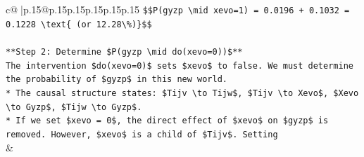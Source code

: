 \documentclass{article}
\begin{document}
{\begin{supertabular}{c@{$\;$}|p{.15\linewidth}@{}p{.15\linewidth}p{.15\linewidth}p{.15\linewidth}p{.15\linewidth}p{.15\linewidth}}
{{{\texttt{\$\$P(gyzp \textbackslash{}mid xevo=1) = 0.0196 + 0.1032 = 0.1228 \textbackslash{}text\{ (or 12.28\textbackslash{}\%)\}\$\$} \\
\\ 
\texttt{**Step 2: Determine \$P(gyzp \textbackslash{}mid do(xevo=0))\$**} \\
\texttt{The intervention \$do(xevo=0)\$ sets \$xevo\$ to false. We must determine the probability of \$gyzp\$ in this new world.} \\
\texttt{*   The causal structure states: \$Tijv \textbackslash{}to Tijw\$, \$Tijv \textbackslash{}to Xevo\$, \$Xevo \textbackslash{}to Gyzp\$, \$Tijw \textbackslash{}to Gyzp\$.} \\
\texttt{*   If we set \$xevo = 0\$, the direct effect of \$xevo\$ on \$gyzp\$ is removed. However, \$xevo\$ is a child of \$Tijv\$. Setting} \\
            }
        }
    }
    & \\ \\


\end{supertabular}}
\end{document}
